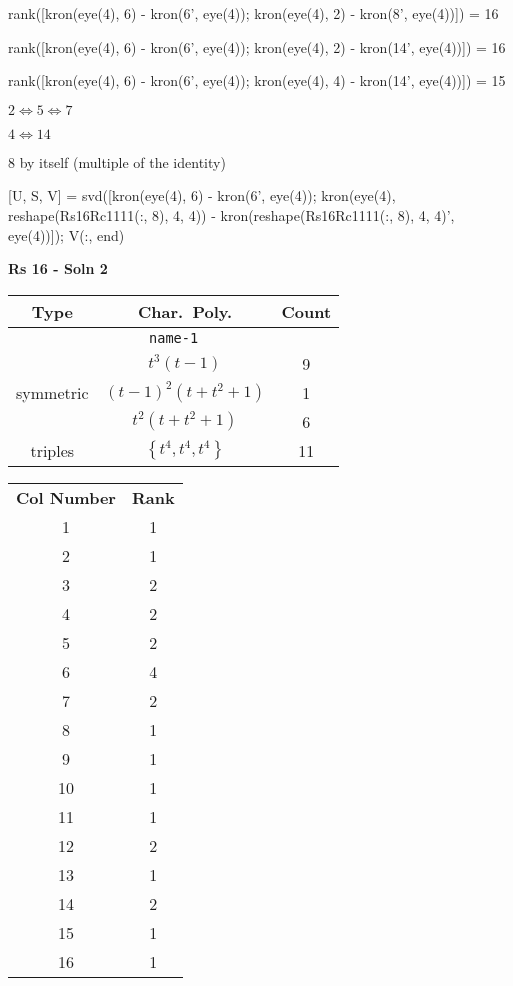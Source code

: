 \documentclass{article}
\begin{document}
    rank([kron(eye(4), 6) - kron(6', eye(4)); kron(eye(4), 2) - kron(8', eye(4))]) = 16
    
    rank([kron(eye(4), 6) - kron(6', eye(4)); kron(eye(4), 2) - kron(14', eye(4))]) = 16
    
    rank([kron(eye(4), 6) - kron(6', eye(4)); kron(eye(4), 4) - kron(14', eye(4))]) = 15

    $2 \Leftrightarrow 5 \Leftrightarrow 7$

    $4 \Leftrightarrow 14$

    $8$  by itself (multiple of the identity)

    [U, S, V] = svd([kron(eye(4), 6) - kron(6', eye(4)); kron(eye(4), reshape(Rs16Rc11{1}{1}(:, 8), 4, 4)) - kron(reshape(Rs16Rc11{1}{1}(:, 8), 4, 4)', eye(4))]);
    V(:, end)
    \newpage


    \textbf{Rs 16 - Soln 2}
    \begin{table}
    \begin{tabular}{|c|c|c|}
    \hline
    \textbf{Type} & \textbf{Char.~Poly.} & \textbf{Count} \\
    \hline \multicolumn{3}{|c|}{\texttt{name-1}} \\ \hline
    \multirow{3}{*}{symmetric}
    & $t^3(t - 1)$ & 9 \\
    & $(t - 1)^2(t + t^2 + 1)$ & 1 \\
    & $t^2(t + t^2 + 1)$ & 6 \\
    \hline
    \multirow{1}{*}{triples}
    & $\left\{t^4,t^4,t^4\right\}$ & 11 \\
    \hline
    \end{tabular}
    \end{table}
    \begin{table}
    \begin{tabular}{|c|c|}
    \hline
    \textbf{Col Number} & \textbf{Rank}\\
    1 & 1 \\ 
    2 & 1 \\ 
    3 & 2 \\ 
    4 & 2 \\ 
    5 & 2 \\ 
    6 & 4 \\ 
    7 & 2 \\ 
    8 & 1 \\ 
    9 & 1 \\ 
    10 & 1 \\ 
    11 & 1 \\ 
    12 & 2 \\ 
    13 & 1 \\ 
    14 & 2 \\ 
    15 & 1 \\ 
    16 & 1 \\ 
    \hline
    \end{tabular}
    \end{table}
\end{document}
